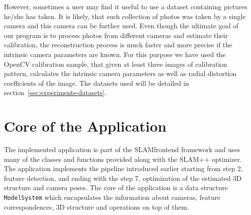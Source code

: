 However, sometimes a user may find it useful to use a dataset containing pictures he/she has taken. It is likely, that such collection of photos was taken by a single camera and this camera can be further used. Even though the ultimate goal of our program is to process photos from different cameras and estimate their calibration, the reconstruction process is much faster and more precise if the intrinsic camera parameters are known. For this purpose we have used the OpenCV calibration sample, that given at least three images of calibration pattern, calculates the intrinsic camera parameters as well as radial distortion coefficients of the image. The datasets used will be detailed in section~\ref{sec:experiments-datasets}.

\section{Core of the Application}
\label{sec:implementation-core}
The implemented application is part of the SLAM\textunderscore frontend framework and uses many of the classes and functions provided along with the SLAM++ optimizer. The application implements the pipeline introduced earlier starting from step 2, feature detection, and ending with the step 7, optimization of the estimated 3D structure and camera poses. The core of the application is a data structure \texttt{ModelSystem} which encapsulates the information about cameras, feature correspondences, 3D structure and operations on top of them. 
